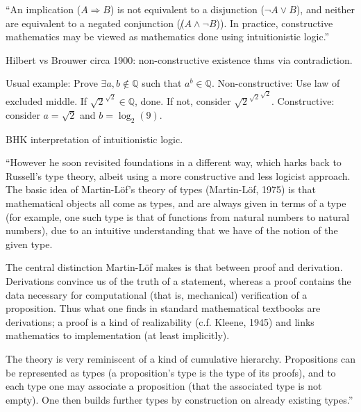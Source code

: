 \label{sec:Constructivism_IEP}
\cite{iep:Constructive_mathematics}

``An implication ($A \Rightarrow B$) is not equivalent 
to a disjunction ($\lnot A \vee B$), 
and neither are equivalent to a negated conjunction 
($\not (A \wedge \lnot B$)). 
In practice, constructive mathematics may be viewed 
as mathematics done using intuitionistic 
logic.''\cite{iep:Constructive_mathematics}

Hilbert vs Brouwer circa 1900: 
non-constructive existence thms via contradiction.

Usual example: Prove $\exists a,b \notin \mathbb{Q}$
such that $a^b \in \mathbb{Q}$. \hfill\break
Non-constructive: Use law of excluded middle.
If $\sqrt{2}^{\sqrt{2}} \in \mathbb{Q}$, done.
If not, consider ${\sqrt{2}^{\sqrt{2}}}^{\sqrt{2}}$.
\hfill\break
Constructive: consider $a=\sqrt{2}$ and $b=\log_2(9)$.

BHK interpretation of intuitionistic 
logic\cite{wiki:Brouwer_Heyting_Kolmogorov_interpretation}.

\label{sec:Martin_Lof_IEP}

``However he soon revisited foundations in a different way, 
which harks back to Russell's type theory, 
albeit using a more constructive and less logicist approach. 
The basic idea of Martin-Löf's theory of types (Martin-Löf, 1975) 
is
that mathematical objects all come as types, 
and are always given in terms of a
type (for example, one such type is that of functions 
from natural numbers to
natural numbers), due to an intuitive understanding 
that we have of the notion
of the given type.

The central distinction Martin-Löf makes is that 
between proof and derivation.
Derivations convince us of the truth of a statement, 
whereas a proof contains the data necessary for computational
(that is, mechanical) verification of a proposition. 
Thus what one finds in standard mathematical textbooks are
derivations; 
a proof is a kind of realizability (c.f. Kleene, 1945) and links
mathematics to implementation (at least implicitly).

The theory is very reminiscent of a kind of cumulative hierarchy. 
Propositions can be represented as types 
(a proposition's type is the type of its proofs),
and to each type one may associate a proposition 
(that the associated type is not empty). 
One then builds further types by construction on already existing
types.''

